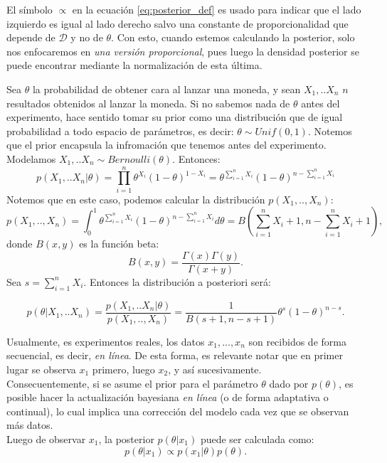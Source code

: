 \begin{remark}
El símbolo $\propto$ en la ecuación \eqref{eq:posterior_def} es usado para indicar que el lado izquierdo es igual al lado derecho salvo una constante de proporcionalidad que depende de $\mathcal{D}$ y no de $\theta$. Con esto, cuando estemos calculando la posterior, solo nos enfocaremos en \emph{una versión proporcional}, pues luego la densidad posterior se puede encontrar mediante la normalización de esta última.
\end{remark}

\begin{example}
\label{ej_post_bernoulli_1}
Sea $\theta$ la probabilidad de obtener cara al lanzar una moneda, y sean $X_1,..X_n$ $n$ resultados obtenidos al lanzar la moneda. Si no sabemos nada de $\theta$ antes del experimento, hace sentido tomar su prior como una distribución que de igual probabilidad a todo espacio de parámetros, es decir: $\theta \sim Unif(0,1)$. Notemos que el prior encapsula la infromación que tenemos antes del experimento. Modelamos $X_1,..X_n \sim Bernoulli(\theta)$. Entonces: 
$$
p(X_1,..X_n|\theta)=\prod_{i=1}^{n} \theta^{X_i} (1-\theta)^{1-X_i} = 
\theta^{\sum_{i=1}^{n} X_i} (1-\theta)^{n-\sum_{i=1}^{n}X_i}
$$
Notemos que en este caso, podemos calcular la distribución $p(X_1,..,X_n)$:
$$
p(X_1,..,X_n)=\int_{0}^{1} \theta^{\sum_{i=1}^{n} X_i} (1-\theta)^{n-\sum_{i=1}^{n}X_i} d\theta = B\left(\sum_{i=1}^{n} X_i +1 , n- \sum_{i=1}^{n} X_i +1 \right),
$$
donde $B(x,y)$ es la función beta:
$$
B(x,y)=\dfrac{\Gamma(x)\Gamma(y)}{\Gamma(x+y)}.
$$
Sea $s= \sum_{i=1}^{n}X_i$. Entonces la distribución a posteriori será:

$$
p(\theta|X_1,..X_n)= \dfrac{p(X_1,..X_n|\theta)}{p(X_1,..,X_n)} = \dfrac{1}{B(s+1,n-s+1)} \theta^{s} (1-\theta)^{n-s}.
$$

\end{example} 

Usualmente, es experimentos reales, los datos  $x_1,...,x_n$ son recibidos de forma secuencial, es decir, \emph{en línea}. De esta forma, es relevante notar que en primer lugar se observa $x_1$ primero, luego $x_2$, y así sucesivamente. \\

Consecuentemente, si se asume el prior para el parámetro $\theta$ dado por $p(\theta)$, es posible hacer la actualización bayesiana \emph{en línea} (o de forma adaptativa o continual), lo cual implica una corrección del modelo cada vez que se observan más datos. \\
Luego de observar $x_1$, la posterior $p(\theta|x_1)$ puede ser calculada como: 
$$
p(\theta|x_1) \propto p(x_1|\theta) p(\theta).
$$

